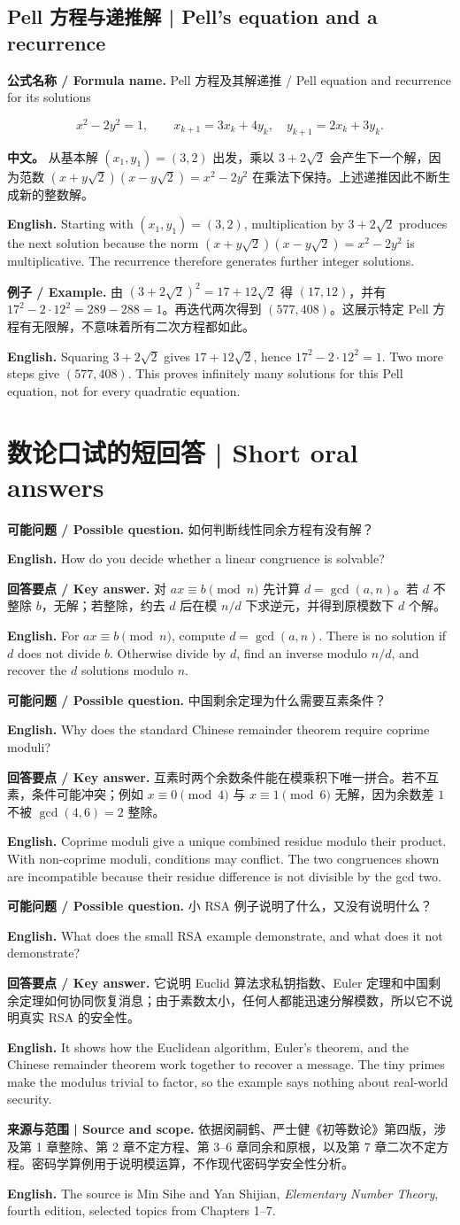 \documentclass[UTF8,11pt,a4paper]{ctexart}
\newcommand{\EN}[1]{\par\noindent \textbf{English.} #1\par}
\newcommand{\BOTH}[2]{\par\noindent\textbf{中文。} #1\par\noindent\textbf{English.} #2\par}
\newcommand{\FORMULA}[2]{\par\noindent\textbf{公式名称 / Formula name.} #1 / #2\par}
\newcommand{\EX}[2]{\par\noindent \textbf{例子 / Example.} #1\par\EN{#2}}
\newcommand{\ASK}[4]{\par\noindent \textbf{可能问题 / Possible question.} #1\par\EN{#2}\noindent \textbf{回答要点 / Key answer.} #3\par\EN{#4}\medskip}
\begin{document}
\subsection{Pell 方程与递推解 | Pell's equation and a recurrence}
\FORMULA{Pell 方程及其解递推}{Pell equation and recurrence for its solutions}
\[
x^2-2y^2=1,\qquad x_{k+1}=3x_k+4y_k,\quad y_{k+1}=2x_k+3y_k.
\]
\BOTH{从基本解 $(x_1,y_1)=(3,2)$ 出发，乘以 $3+2\sqrt2$ 会产生下一个解，因为范数 $(x+y\sqrt2)(x-y\sqrt2)=x^2-2y^2$ 在乘法下保持。上述递推因此不断生成新的整数解。}{Starting with $(x_1,y_1)=(3,2)$, multiplication by $3+2\sqrt2$ produces the next solution because the norm $(x+y\sqrt2)(x-y\sqrt2)=x^2-2y^2$ is multiplicative. The recurrence therefore generates further integer solutions.}
\EX{由 $(3+2\sqrt2)^2=17+12\sqrt2$ 得 $(17,12)$，并有 $17^2-2\cdot12^2=289-288=1$。再迭代两次得到 $(577,408)$。这展示特定 Pell 方程有无限解，不意味着所有二次方程都如此。}{Squaring $3+2\sqrt2$ gives $17+12\sqrt2$, hence $17^2-2\cdot12^2=1$. Two more steps give $(577,408)$. This proves infinitely many solutions for this Pell equation, not for every quadratic equation.}

\section{数论口试的短回答 | Short oral answers}
\ASK{如何判断线性同余方程有没有解？}{How do you decide whether a linear congruence is solvable?}{对 $ax\equiv b\pmod n$ 先计算 $d=\gcd(a,n)$。若 $d$ 不整除 $b$，无解；若整除，约去 $d$ 后在模 $n/d$ 下求逆元，并得到原模数下 $d$ 个解。}{For $ax\equiv b\pmod n$, compute $d=\gcd(a,n)$. There is no solution if $d$ does not divide $b$. Otherwise divide by $d$, find an inverse modulo $n/d$, and recover the $d$ solutions modulo $n$.}
\ASK{中国剩余定理为什么需要互素条件？}{Why does the standard Chinese remainder theorem require coprime moduli?}{互素时两个余数条件能在模乘积下唯一拼合。若不互素，条件可能冲突；例如 $x\equiv0\pmod4$ 与 $x\equiv1\pmod6$ 无解，因为余数差 $1$ 不被 $\gcd(4,6)=2$ 整除。}{Coprime moduli give a unique combined residue modulo their product. With non-coprime moduli, conditions may conflict. The two congruences shown are incompatible because their residue difference is not divisible by the gcd two.}
\ASK{小 RSA 例子说明了什么，又没有说明什么？}{What does the small RSA example demonstrate, and what does it not demonstrate?}{它说明 Euclid 算法求私钥指数、Euler 定理和中国剩余定理如何协同恢复消息；由于素数太小，任何人都能迅速分解模数，所以它不说明真实 RSA 的安全性。}{It shows how the Euclidean algorithm, Euler's theorem, and the Chinese remainder theorem work together to recover a message. The tiny primes make the modulus trivial to factor, so the example says nothing about real-world security.}
\par\medskip\begingroup\small
\enlargethispage{2\baselineskip}
\noindent\textbf{来源与范围 | Source and scope.}
依据闵嗣鹤、严士健《初等数论》第四版，涉及第 1 章整除、第 2 章不定方程、第 3--6 章同余和原根，以及第 7 章二次不定方程。密码学算例用于说明模运算，不作现代密码学安全性分析。
\EN{The source is Min Sihe and Yan Shijian, \emph{Elementary Number Theory}, fourth edition, selected topics from Chapters 1--7.}
\par\endgroup
\end{document}
